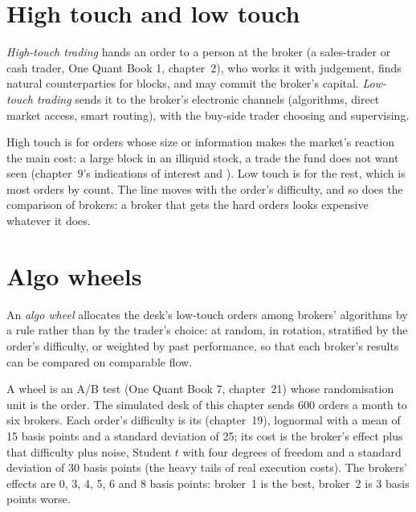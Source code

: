 \section{High touch and low touch}

\begin{definition}\label{def:mx:the-buy-side-trading-desk-and-its-brokers:touch}
\emph{High-touch trading} hands an order to a person at the broker (a sales-trader or cash trader, One Quant Book 1, chapter~2),
who works it with judgement, finds natural counterparties for blocks, and may commit the broker's capital. \emph{Low-touch
trading} sends it to the broker's electronic channels (algorithms, direct market access, smart routing), with the buy-side
trader choosing and supervising.
\end{definition}

High touch is for orders whose size or information makes the market's reaction the main cost: a large block in an illiquid stock, a trade the fund
does not want seen (chapter~9's indications of interest and ). Low touch is for the rest, which is most orders by count. The line
moves with the order's difficulty, and so does the comparison of brokers: a broker that gets the hard orders looks expensive whatever it does.

\section{Algo wheels}

\begin{definition}\label{def:mx:the-buy-side-trading-desk-and-its-brokers:wheel}
An \emph{algo wheel} allocates the desk's low-touch orders among brokers' algorithms by a rule rather than by the trader's choice:
at random, in rotation, stratified by the order's difficulty, or weighted by past performance, so that each broker's results can be compared on
comparable flow.
\end{definition}

A wheel is an A/B test (One Quant Book 7, chapter~21) whose randomisation unit is the order. The simulated desk of this chapter sends 600 orders a
month to six brokers. Each order's difficulty is its  (chapter~19), lognormal with a mean of 15 basis points and a standard
deviation of 25; its cost is the broker's effect plus that difficulty plus noise, Student $t$ with four degrees of freedom and a standard deviation of 30
basis points (the heavy tails of real execution costs). The brokers' effects are 0, 3, 4, 5, 6 and 8 basis points: broker~1 is the best, broker~2 is 3
basis points worse.

